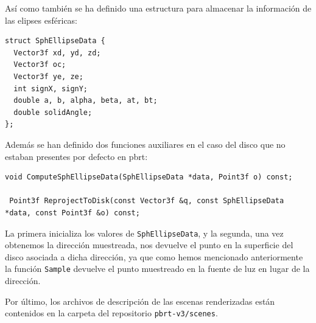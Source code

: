 Así como también se ha definido una estructura para almacenar la información de las elipses esféricas:
\begin{lstlisting}[style = CodigoC++]
struct SphEllipseData {
  Vector3f xd, yd, zd;
  Vector3f oc;
  Vector3f ye, ze;
  int signX, signY;
  double a, b, alpha, beta, at, bt;
  double solidAngle;
};
\end{lstlisting}

Además se han definido dos funciones auxiliares en el caso del disco que no estaban presentes por defecto en pbrt:
\begin{lstlisting}[style = CodigoC++]
void ComputeSphEllipseData(SphEllipseData *data, Point3f o) const;

 Point3f ReprojectToDisk(const Vector3f &q, const SphEllipseData *data, const Point3f &o) const;
\end{lstlisting}

La primera inicializa los valores de \lstinline{SphEllipseData}, y la segunda, una vez obtenemos la dirección muestreada, nos devuelve el punto en la superficie del disco asociada a dicha dirección, ya que como hemos mencionado anteriormente la función \lstinline{Sample} devuelve el punto muestreado en la fuente de luz en lugar de la dirección.

Por último, los archivos de descripción de las escenas renderizadas están contenidos en la carpeta del repositorio \lstinline{pbrt-v3/scenes}.
